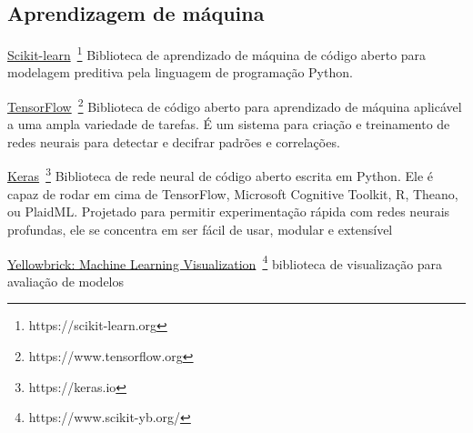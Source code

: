 \subsection*{Aprendizagem de máquina}

\underline{Scikit-learn}~\footnote{https://scikit-learn.org}
Biblioteca de aprendizado de máquina de código aberto para modelagem preditiva pela linguagem de programação Python.

\underline{TensorFlow}~\footnote{https://www.tensorflow.org}
Biblioteca de código aberto para aprendizado de máquina aplicável a uma ampla variedade de tarefas. 
É um sistema para criação e treinamento de redes neurais para detectar e decifrar padrões e correlações.

\underline{Keras}~\footnote{https://keras.io}
Biblioteca de rede neural de código aberto escrita em Python. 
Ele é capaz de rodar em cima de TensorFlow, Microsoft Cognitive Toolkit, R, Theano, ou PlaidML. 
Projetado para permitir experimentação rápida com redes neurais profundas, ele se concentra em ser fácil de usar, modular e extensível

\underline{Yellowbrick: Machine Learning Visualization}~\footnote{https://www.scikit-yb.org/}
biblioteca de visualização para avaliação de modelos
